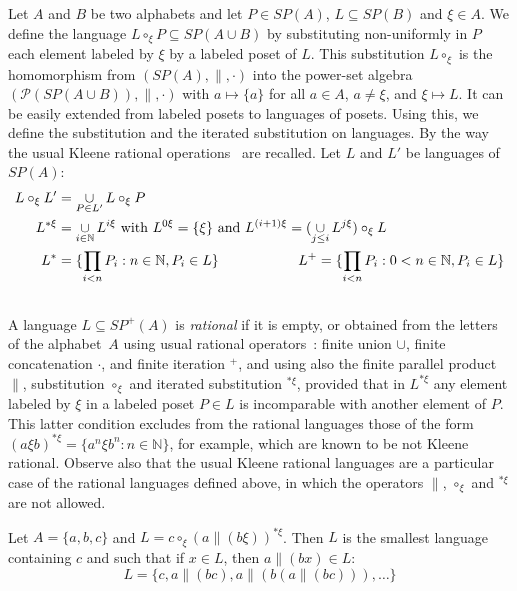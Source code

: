 \documentclass{CSML}
\begin{document}
Let $A$ and $B$ be two alphabets and let $P\in SP(A)$, $L\subseteq SP(B)$ and $ \xi \in A$.
We define the language $L\circ_\xi P\subseteq SP(A\cup B)$ by substituting non-uniformly in $P$ each element labeled by $\xi$ by a labeled poset of $L$.
This substitution $L \circ_\xi$ is the homomorphism from $(SP(A),\parallel, \cdot)$ into the power-set algebra $({\mathcal P}(SP(A \cup B)),\parallel, \cdot)$ with $a \mapsto \{a\}$ for all $a\in A$, $a\not=\xi$, and $\xi \mapsto L$. 
It can be easily extended from labeled posets to languages of posets.
Using this, we define the substitution and the iterated substitution on languages. By the way the usual Kleene rational operations~\cite{Kle56} are recalled.
Let $L$ and $L'$ be languages of $SP(A)$:
\begin{align*}
  L \circ_\xi L'& = \mathop{\cup}\limits_{ P\in L'}  L \circ_\xi P \\ 
  L^{*\xi} & =\mathop{\cup}\limits_{i\in{\mathbb{N}}} L^{i\xi}\text{ with }L^{0\xi}=\{\xi\}\text{ and }L^{(i+1)\xi}=(\mathop{\cup}\limits_{j\leq i}L^{j\xi})\circ_\xi L \\ 
  L^* & = \{\prod_{i<n}P_i : n\in {\mathbb{N}}, P_i\in L\}\hskip2cm L^+ = \{\prod_{i<n}P_i : 0<n\in {\mathbb{N}}, P_i\in L\}\\\ 
\end{align*}
A language $L \subseteq SP^+(A)$ is
\emph{rational} if it is empty, or obtained from the letters of the alphabet~$A$ using usual rational operators~: finite union $\cup$,
finite concatenation $\cdot$, and finite iteration $^+$, 
and using also the finite parallel product $\parallel$, substitution $\circ_{\xi}$ and iterated substitution $^{*\xi}$, provided that in $L^{*\xi}$ any element labeled by $\xi$ in a labeled poset $P\in L$ is incomparable with another element of $P$. This latter condition excludes from the rational languages those of the form $(a\xi b)^{*\xi}=\{a^n\xi b^n : n\in\mathbb{N}\}$, for example, which are known to be not Kleene rational. Observe also that the usual Kleene rational languages are a particular case of the rational languages defined above, in which the operators $\parallel$, $\circ_{\xi}$ and $^{*\xi}$ are not allowed.

\begin{exa}
  \label{ex:abc}
  Let $A=\{a,b,c\}$ and $L=c\circ_\xi(a\parallel(b\xi))^{*\xi}$. Then $L$ is the smallest language containing $c$ and such that if $x\in L$, then $a\parallel(bx)\in L$:
  $$L=\{c,a\parallel(bc),a\parallel(b(a\parallel(bc))),\dots\}$$
\end{exa}
\end{document}
